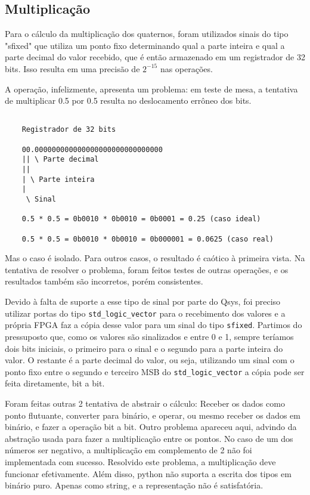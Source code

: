 \documentclass [12pt,oneside] {article}
\begin{document}
\subsection{Multiplicação}

	Para o cálculo da multiplicação dos quaternos, foram
utilizados sinais do tipo "sfixed" que utiliza um ponto fixo
determinando qual a parte inteira e qual a parte decimal do valor
recebido, que é então armazenado em um registrador de 32 bits. Isso
resulta em uma precisão de $2^{-15}$ nas operações.

	A operação, infelizmente, apresenta um problema: em teste de
mesa, a tentativa de multiplicar 0.5 por 0.5 resulta no deslocamento
errôneo dos bits.

\begin{footnotesize} \begin{verbatim}

	Registrador de 32 bits

	00.000000000000000000000000000000
	|| \ Parte decimal
	||
	| \ Parte inteira
	|
	 \ Sinal

	0.5 * 0.5 = 0b0010 * 0b0010 = 0b0001 = 0.25 (caso ideal)

	0.5 * 0.5 = 0b0010 * 0b0010 = 0b000001 = 0.0625 (caso real)

\end{verbatim} \end{footnotesize}

Mas o caso é isolado. Para outros casos, o resultado é caótico à
primeira vista. Na tentativa de resolver o problema, foram feitos
testes de outras operações, e os resultados também são incorretos,
porém consistentes.

	Devido à falta de suporte a esse tipo de sinal por parte do
Qsys, foi preciso utilizar portas do tipo \texttt{std\_logic\_vector}
para o recebimento dos valores e a própria FPGA faz a cópia desse
valor para um sinal do tipo \texttt{sfixed}. Partimos do pressuposto que,
como os valores são sinalizados e entre 0 e 1, sempre teríamos dois
bits iniciais, o primeiro para o sinal e o segundo para a parte
inteira do valor. O restante é a parte decimal do valor, ou seja,
utilizando um sinal com o ponto fixo entre o segundo e terceiro MSB do
\texttt{std\_logic\_vector} a cópia pode ser feita diretamente, bit a
bit.

	Foram feitas outras 2 tentativa de abstrair o cálculo: Receber
os dados como ponto flutuante, converter para binário, e operar, ou
mesmo receber os dados em binário, e fazer a operação bit a bit. Outro
problema apareceu aqui, advindo da abstração usada para fazer a
multiplicação entre os pontos. No caso de um dos números ser negativo,
a multiplicação em complemento de 2 não foi implementada com sucesso.
Resolvido este problema, a multiplicação deve funcionar efetivamente.
Além disso, python não suporta a escrita dos tipos em binário puro.
Apenas como string, e a representação não é satisfatória.
\end{document}
